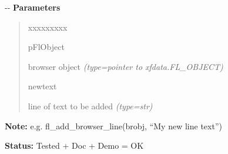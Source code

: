 \begin{boxedminipage}{\funcwidth}
-{}-
\setlength{\parskip}{1ex}
      \textbf{Parameters}
      \vspace{-1ex}

      \begin{quote}
        \begin{Ventry}{xxxxxxxxx}

          \item[pFlObject]


browser object
            {\it (type=pointer to xfdata.FL\_OBJECT)}

          \item[newtext]


line of text to be added
            {\it (type=str)}

        \end{Ventry}

      \end{quote}

\textbf{Note:} 
e.g. fl\_add\_browser\_line(brobj, ``My new line text'')


\textbf{Status:} 
Tested + Doc + Demo = OK


    \end{boxedminipage}

    \label{xformslib:flbrowser:fl_addto_browser}

    \vspace{0.5ex}

